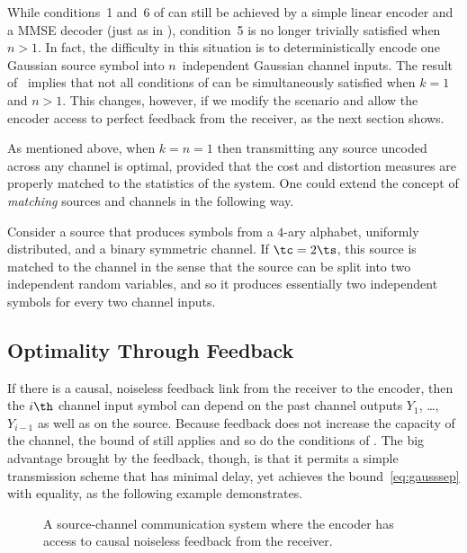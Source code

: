 While conditions~1 and~6 of  can still be achieved
by a simple linear encoder and a MMSE decoder (just as in ),
condition~5 is no longer trivially satisfied when $n > 1$. In fact, the
difficulty in this situation is to deterministically encode one Gaussian source
symbol into $n$~independent Gaussian channel inputs. The result
of~\cite{IngberLZF2008} implies that not all conditions of
 can be simultaneously satisfied when $k = 1$ and
$n > 1$.  This changes, however, if we modify the scenario and allow the encoder
access to perfect feedback from the receiver, as the next section shows.

\begin{remark}
  \label{rem:ratematched}
  As mentioned above, when $k = n = 1$ then transmitting any source uncoded
  across any channel is optimal, provided that the cost and distortion measures
  are properly matched to the statistics of the system. One could extend the
  concept of \emph{matching} sources and channels in the following way. 

  Consider a source that produces symbols from a $4$-ary alphabet, uniformly
  distributed, and a binary symmetric channel. If $\tc = 2\ts$, this source is
  matched to the channel in the sense that the source can be split into two
  independent random variables, and so it produces essentially two independent
  symbols for every two channel inputs.
\end{remark}


\subsection{Optimality Through Feedback}

If there is a causal, noiseless feedback link from the receiver to the encoder,
then the $i\th$ channel input symbol can depend on the past channel outputs
$Y_1$, \dots, $Y_{i-1}$ as well as on the source. Because feedback does not
increase the capacity of the channel, the bound of 
still applies and so do the conditions of . The big
advantage brought by the feedback, though, is that it permits a simple
transmission scheme that has minimal delay, yet achieves the
bound~\eqref{eq:gausssep} with equality, as the following example demonstrates.

\begin{figure}
  \begin{center}
    
  \end{center}
  \caption{A source-channel communication system where the encoder has access to
  causal noiseless feedback from the receiver.}
  \label{fig:scgenfeedback}
\end{figure}

